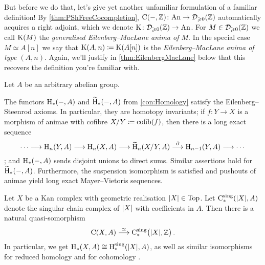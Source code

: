\begin{con}
	But before we do that, let's give yet another unfamiliar formulation of a familiar definition! By \cref{thm:PShFreeCocompletion}, $\operatorname{C}(-,\mathbb{Z})\colon \mathrm{An}\rightarrow \mathcal{D}_{\geqslant 0}(\mathbb{Z})$ automatically acquires a right adjoint, which we denote $\operatorname{K}\colon \mathcal{D}_{\geqslant 0}(\mathbb{Z})\rightarrow\mathrm{An}$. For $M\in\mathcal{D}_{\geqslant 0}(\mathbb{Z})$ we call $\operatorname{K}(M)$ the \emph{generalised Eilenberg--MacLane anima of $M$}. In the special case $M\simeq A[n]$ we say that $\operatorname{K}(A,n)\coloneqq \operatorname{K}(A[n])$ is the \emph{Eilenberg--MacLane anima of type $(A,n)$}. Again, we'll justify in \cref{thm:EilenbergMacLane} below that this recovers the definition you're familiar with.
\end{con}
\begin{lem}\label{lem:Homology}
	Let $A$ be an arbitrary abelian group.
	\begin{alphanumerate}
		\item The functors $\mathrm{H}_*(-,A)$ and $\widetilde{\mathrm{H}}_*(-,A)$ from \cref{con:Homology} satisfy the Eilenberg--Steenrod axioms. In particular, they are homotopy invariants; if $f\colon Y\rightarrow X$ is a morphism of animae with cofibre $X/Y\coloneqq\operatorname{cofib}(f)$, then there is a long exact sequence\label{enum:HomologyEilenbergSteenrod}
		\begin{equation*}
			\dotsb\longrightarrow\mathrm{H}_n(Y,A)\longrightarrow\mathrm{H}_n(X,A)\longrightarrow\widetilde{\mathrm{H}}_n(X/Y,A)\overset{\partial}{\longrightarrow}\mathrm{H}_{n-1}(Y,A)\longrightarrow\dotsb
		\end{equation*}
		; and $\mathrm{H}_*(-,A)$ sends disjoint unions to direct sums. Similar assertions hold for $\widetilde{\mathrm{H}}_*(-,A)$. Furthermore, the suspension isomorphism is satisfied and pushouts of animae yield long exact Mayer--Vietoris sequences.
		\item Let $X$ be a Kan complex with geometric realisation $\abs*{X}\in\cat{Top}$. Let $\C_*^\mathrm{sing}(\abs*{X},A)$ denote the singular chain complex of $\abs*{X}$ with coefficients in $A$. Then there is a natural quasi-somorphism
		\begin{equation*}
			\C(X,A)\overset{\simeq}{\longrightarrow} \C^\mathrm{sing}_*\bigl(\abs{X},\IZ\bigr)\,.
		\end{equation*}
		In particular, we get $\H_*(X,A)\cong \H_*^\mathrm{sing}(\abs*{X},A)$, as well as similar isomorphisms for reduced homology and for cohomology .\label{enum:SingularHomology}
	\end{alphanumerate}
\end{lem}
